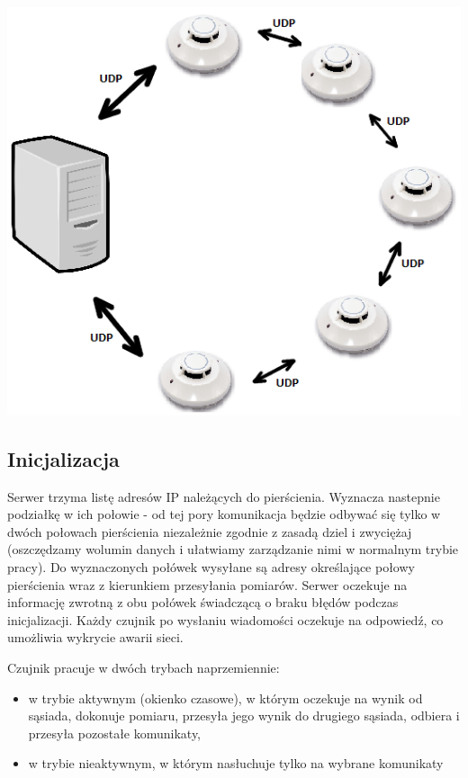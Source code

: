 \documentclass[a4paper,11pt]{article}
\begin{document}
\begin{center}
\includegraphics[scale=0.5]{architektura}
\end{center}

\subsection{Inicjalizacja}
Serwer trzyma listę adresów IP należących do pierścienia.
Wyznacza nastepnie podziałkę w ich połowie - od tej pory komunikacja będzie odbywać się tylko w dwóch
połowach pierścienia niezależnie zgodnie z zasadą dziel i zwyciężaj
(oszczędzamy wolumin danych i ułatwiamy zarządzanie nimi w normalnym trybie pracy).
Do wyznaczonych połówek wysyłane są adresy określające połowy pierścienia wraz z kierunkiem
przesyłania pomiarów. Serwer oczekuje na informację zwrotną z obu połówek świadczącą o braku
błędów podczas inicjalizacji. Każdy czujnik po wysłaniu wiadomości oczekuje na odpowiedź,
co umożliwia wykrycie awarii sieci.

\newpage
Czujnik pracuje w dwóch trybach naprzemiennie:
\begin{itemize}
\item w trybie aktywnym (okienko czasowe), w którym oczekuje na wynik od sąsiada,
      dokonuje pomiaru, przesyła jego wynik do drugiego sąsiada,
      odbiera i przesyła pozostałe komunikaty,
\item w trybie nieaktywnym, w którym nasłuchuje tylko na wybrane komunikaty
\end{itemize}
\end{document}
